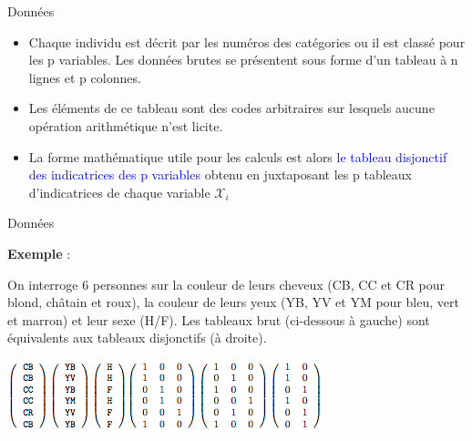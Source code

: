 \documentclass[12pt]{beamer}
\begin{document}
\begin{frame}{Données }

\begin{itemize}
\item Chaque individu est décrit par les numéros des catégories ou il est classé pour les p variables. Les données brutes se présentent sous forme d'un tableau à n lignes et p colonnes.

\item Les éléments de ce tableau sont des codes arbitraires sur lesquels aucune opération arithmétique n'est licite.

\item La forme mathématique utile pour les calculs est alors \textcolor{blue}{le tableau disjonctif des indicatrices des p variables} obtenu en juxtaposant les p tableaux d'indicatrices de chaque variable $\mathcal{X}_i$
\end{itemize}

\end{frame}


\begin{frame}{Données  }

\textbf{Exemple} : 

On interroge 6 personnes sur la couleur de leurs
cheveux (CB, CC et CR pour blond, châtain et roux), la couleur
de leurs yeux (YB, YV et YM pour bleu, vert et marron) et leur
sexe (H/F).   Les tableaux brut (ci-dessous à gauche) sont équivalents aux tableaux disjonctifs (à droite).

\centering 
\includegraphics[scale=0.8]{disj.png} 


\end{frame}
\end{document}
